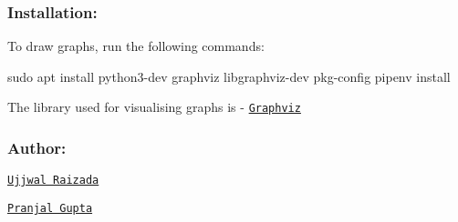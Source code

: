 \subsubsection*{Installation\+:}

To draw graphs, run the following commands\+: 
\begin{DoxyCode}
sudo apt install python3-dev graphviz libgraphviz-dev pkg-config
pipenv install
\end{DoxyCode}


The library used for visualising graphs is -\/ \href{https://pygraphviz.github.io/documentation/latest/tutorial.html}{\tt Graphviz}

\subsubsection*{Author\+:}


\begin{DoxyItemize}
\item \href{https://github.com/ujjwal-raizada}{\tt Ujjwal Raizada}
\item \href{https://github.com/PranjalGupta2199}{\tt Pranjal Gupta} 
\end{DoxyItemize}